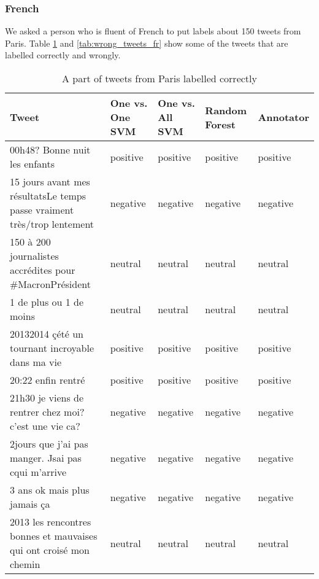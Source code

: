 \subsubsection{French}
We asked a person who is fluent of French to put labels about 150 tweets from Paris.
Table \ref{tab:correct_tweets_fr} and  \ref{tab:wrong_tweets_fr}  show some of the tweets that are labelled correctly and wrongly.
\begin{table}[ht]
	\caption{A part of tweets from Paris labelled correctly}
	\begin{tabular}{|p{5cm}|p{1.8cm}|p{1.8cm}|p{1.8cm}|p{1.8cm}|} \hline
	Tweet & One vs. One SVM &One vs. All SVM &Random Forest & Annotator\\ \hline

	00h48? Bonne nuit les enfants &positive & positive &positive & positive \\ \hline
	15 jours avant mes r\'esultatsLe temps passe vraiment tr\`es/trop lentement & negative& negative& negative& negative \\ \hline
	150 \`a 200 journalistes accr\'edites pour \#MacronPr\'esident & neutral & neutral& neutral& neutral\\ \hline
	1 de plus ou 1 de moins & neutral& neutral& neutral& neutral \\ \hline
	20132014 \c c\'et\'e un tournant incroyable dans ma vie &positive&positive&positive&positive \\ \hline

	20:22 enfin rentr\'e &positive&positive&positive&positive \\ \hline
	21h30 je viens de rentrer chez moi? c'est une vie ca? &negative &negative&negative&negative\\ \hline
	2jours que j'ai pas manger. Jsai pas cqui m'arrive &negative &negative&negative&negative\\ \hline
	3 ans ok mais plus jamais \c ca &negative &negative&negative&negative\\ \hline
	2013 les rencontres bonnes et mauvaises qui ont crois\'e mon chemin &neutral&neutral&neutral&neutral\\ \hline


	\end{tabular}
	\label{tab:correct_tweets_fr}
\end{table}



